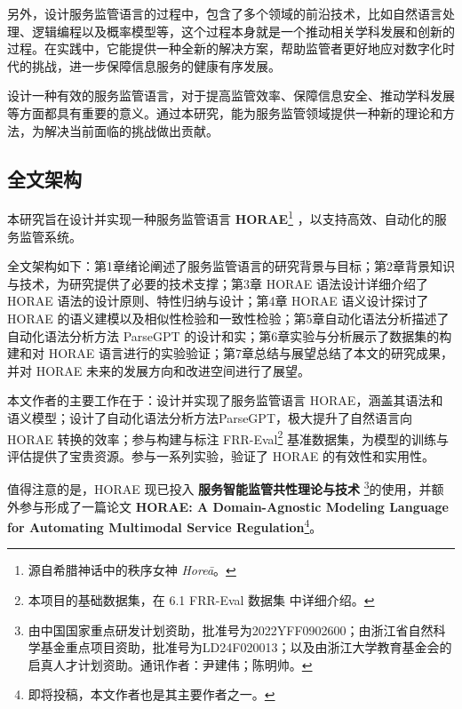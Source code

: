 另外，设计服务监管语言的过程中，包含了多个领域的前沿技术，比如自然语言处理、逻辑编程以及概率模型等，这个过程本身就是一个推动相关学科发展和创新的过程。在实践中，它能提供一种全新的解决方案，帮助监管者更好地应对数字化时代的挑战，进一步保障信息服务的健康有序发展。

设计一种有效的服务监管语言，对于提高监管效率、保障信息安全、推动学科发展等方面都具有重要的意义。通过本研究，能为服务监管领域提供一种新的理论和方法，为解决当前面临的挑战做出贡献。

\subsection{全文架构}

本研究旨在设计并实现一种服务监管语言 \textbf{HORAE}\footnote{源自希腊神话中的秩序女神 \textit{Horeā}。} ，以支持高效、自动化的服务监管系统。

全文架构如下：第1章绪论阐述了服务监管语言的研究背景与目标；第2章背景知识与技术，为研究提供了必要的技术支撑；第3章 HORAE 语法设计详细介绍了 HORAE 语法的设计原则、特性归纳与设计；第4章 HORAE 语义设计探讨了 HORAE 的语义建模以及相似性检验和一致性检验；第5章自动化语法分析描述了自动化语法分析方法 ParseGPT 的设计和实；第6章实验与分析展示了数据集的构建和对 HORAE 语言进行的实验验证；第7章总结与展望总结了本文的研究成果，并对 HORAE 未来的发展方向和改进空间进行了展望。

本文作者的主要工作在于：设计并实现了服务监管语言 HORAE，涵盖其语法和语义模型；设计了自动化语法分析方法ParseGPT，极大提升了自然语言向 HORAE 转换的效率；参与构建与标注 FRR-Eval\footnote{本项目的基础数据集，在 6.1 FRR-Eval 数据集 中详细介绍。} 基准数据集，为模型的训练与评估提供了宝贵资源。参与一系列实验，验证了 HORAE 的有效性和实用性。

值得注意的是，HORAE 现已投入 \textbf{服务智能监管共性理论与技术} \footnote{由中国国家重点研发计划资助，批准号为2022YFF0902600；由浙江省自然科学基金重点项目资助，批准号为LD24F020013；以及由浙江大学教育基金会的启真人才计划资助。通讯作者：尹建伟；陈明帅。}的使用，并额外参与形成了一篇论文 \textbf{ HORAE: A Domain-Agnostic Modeling Language
for Automating Multimodal Service Regulation}\footnote{即将投稿，本文作者也是其主要作者之一。}。